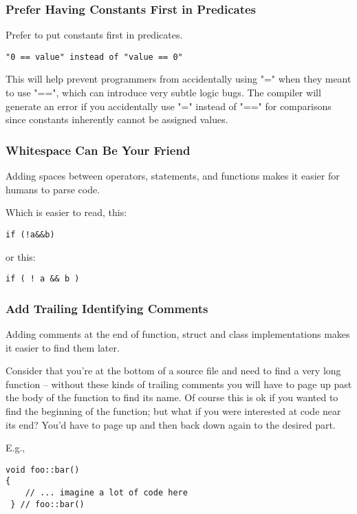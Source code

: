 \subsubsection{Prefer Having Constants First in Predicates}
Prefer to put constants first in predicates. 

\begin{verbatim}
"0 == value" instead of "value == 0"
\end{verbatim}

This will help prevent programmers from accidentally using "=" when they meant to use "==", which can introduce very subtle 
logic bugs.  The compiler will generate an error if you accidentally use "=" instead of "==" for comparisons since constants 
inherently cannot be assigned values.

\subsubsection{Whitespace Can Be Your Friend}
Adding spaces between operators, statements, and functions makes it easier for humans to parse code.

Which is easier to read, this:

\begin{verbatim}
if (!a&&b)
\end{verbatim}

or this:

\begin{verbatim}
if ( ! a && b )
\end{verbatim}

\subsubsection{Add Trailing Identifying Comments}
Adding comments at the end of function, struct and class implementations makes it easier to find them later.

Consider that you're at the bottom of a source file and need to find a very long function -- without these kinds of trailing 
comments you will have to page up past the body of the function to find its name.  Of course this is ok if you wanted to find 
the beginning of the function; but what if you were interested at code near its end?  You'd have to page up and then back down 
again to the desired part.

E.g.,

\begin{verbatim}
void foo::bar()
{ 
    // ... imagine a lot of code here 
 } // foo::bar()
\end{verbatim}

